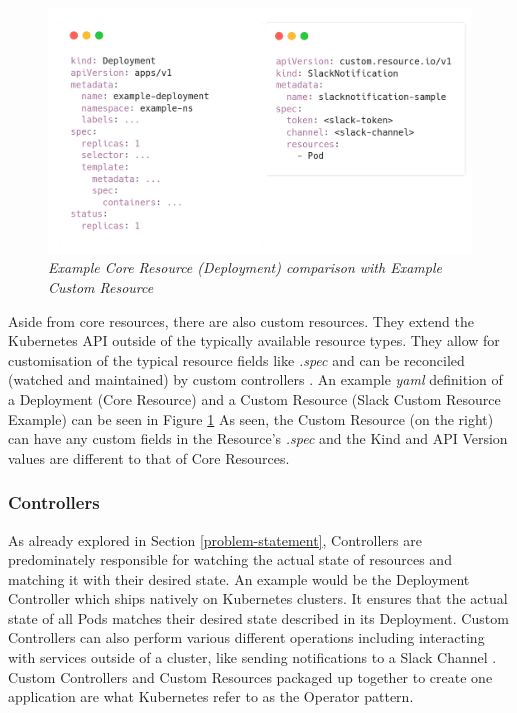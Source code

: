 \documentclass{article}
\begin{document}
\begin{figure}[H]
    \centering
    \includegraphics[width=125mm]{tech/core-cr.png}
    \caption{\emph{Example Core Resource (Deployment) comparison with Example Custom Resource}}
    \label{core-cr}
\end{figure}

Aside from core resources, there are also custom resources. They extend the Kubernetes API outside of the typically available resource types. They allow for customisation of the typical resource fields like \emph{.spec} and can be reconciled (watched and maintained) by custom controllers \cite{cust-res}. An example \emph{yaml} definition of a Deployment (Core Resource) and a Custom Resource (Slack Custom Resource Example) can be seen in Figure \ref{core-cr} As seen, the Custom Resource (on the right) can have any custom fields in the Resource's \emph{.spec} and the Kind and API Version values are different to that of Core Resources.



\subsubsection{Controllers} \label{controllers}

As already explored in Section \ref{problem-statement}, Controllers are predominately responsible for watching the actual state of resources and matching it with their desired state. An example would be the Deployment Controller which ships natively on Kubernetes clusters. It ensures that the actual state of all Pods matches their desired state described in its Deployment. Custom Controllers can also perform various different operations including interacting with services outside of a cluster, like sending notifications to a Slack Channel \cite{ctrlrs-ref}. Custom Controllers and Custom Resources packaged up together to create one application are what Kubernetes refer to as the Operator pattern.
\end{document}
